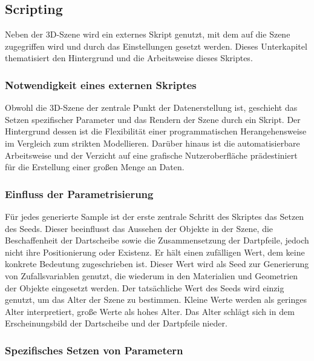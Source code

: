 
\subsection{Scripting}  %
\label{sec:scripting}

Neben der 3D-Szene wird ein externes Skript genutzt, mit dem auf die Szene zugegriffen wird und durch das Einstellungen gesetzt werden. Dieses Unterkapitel thematisiert den Hintergrund und die Arbeitsweise dieses Skriptes.

\subsubsection{Notwendigkeit eines externen Skriptes}

Obwohl die 3D-Szene der zentrale Punkt der Datenerstellung ist, geschieht das Setzen spezifischer Parameter und das Rendern der Szene durch ein Skript. Der Hintergrund dessen ist die Flexibilität einer programmatischen Herangehensweise im Vergleich zum strikten Modellieren. Darüber hinaus ist die automatisierbare Arbeitsweise und der Verzicht auf eine grafische Nutzeroberfläche prädestiniert für die Erstellung einer großen Menge an Daten.

\subsubsection{Einfluss der Parametrisierung}

Für jedes generierte Sample ist der erste zentrale Schritt des Skriptes das Setzen des Seeds. Dieser beeinflusst das Aussehen der Objekte in der Szene, die Beschaffenheit der Dartscheibe sowie die Zusammensetzung der Dartpfeile, jedoch nicht ihre Positionierung oder Existenz. Er hält einen zufälligen Wert, dem keine konkrete Bedeutung zugeschrieben ist. Dieser Wert wird als Seed zur Generierung von Zufallsvariablen genutzt, die wiederum in den Materialien und Geometrien der Objekte eingesetzt werden. Der tatsächliche Wert des Seeds wird einzig genutzt, um das Alter der Szene zu bestimmen. Kleine Werte werden als geringes Alter interpretiert, große Werte als hohes Alter. Das Alter schlägt sich in dem Erscheinungsbild der Dartscheibe und der Dartpfeile nieder.

\subsubsection{Spezifisches Setzen von Parametern}

